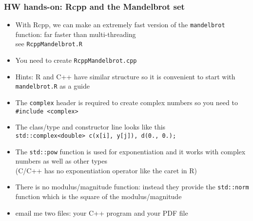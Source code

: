 \documentclass[11pt,pdftex,dvipsnames,usenames,helvetica]{beamer}
\begin{document}
\begin{frame}[fragile]
\frametitle{HW hands-on: Rcpp and the Mandelbrot set}
\begin{itemize}
\item With Rcpp, we can make an extremely fast version of
the {\tt mandelbrot} function: far faster than multi-threading\\ 
see {\tt RcppMandelbrot.R}
\item You need to create {\tt RcppMandelbrot.cpp}
\item Hints:  R and C++ have similar structure so it is convenient to 
start with {\tt mandelbrot.R} as a guide
\item The {\tt complex} header is required to
create complex numbers so you need to {\tt \#include <complex>}
\item The class/type and constructor line looks like this\\
{\tt std::complex<double> c(x[i], y[j]), d(0., 0.);}
\item The {\tt std::pow} function is used for exponentiation
and it works with complex numbers as well as other types\\
(C/C++ has no exponentiation operator like the caret in R)
\item There is no modulus/magnitude function: instead they
provide the {\tt std::norm} function which is the square of
the modulus/magnitude
\item email me two files: your C++ program and your PDF file
\end{itemize}
\end{frame}
\end{document}
